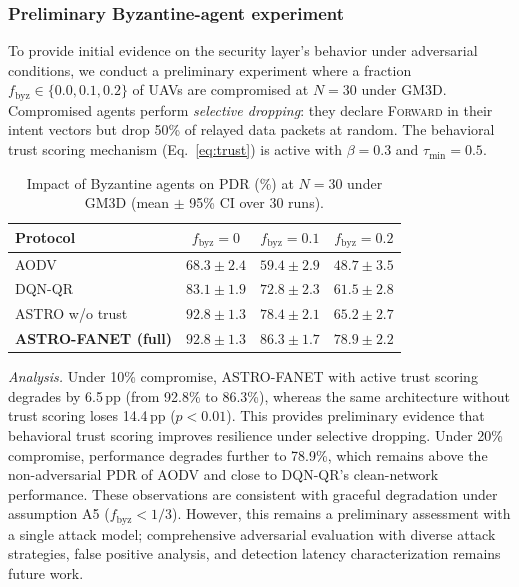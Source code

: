 \documentclass[5p,times]{elsarticle}
\begin{document}
\subsubsection{Preliminary Byzantine-agent experiment}
\label{subsec:byzantine}

To provide initial evidence on the security layer's behavior under adversarial conditions, we conduct a preliminary experiment where a fraction $f_{\mathrm{byz}} \in \{0.0, 0.1, 0.2\}$ of UAVs are compromised at $N=30$ under GM3D. Compromised agents perform \emph{selective dropping}: they declare \textsc{Forward} in their intent vectors but drop 50\% of relayed data packets at random. The behavioral trust scoring mechanism (Eq.~\eqref{eq:trust}) is active with $\beta = 0.3$ and $\tau_{\min} = 0.5$.

\begin{table}[t]
\centering
\caption{Impact of Byzantine agents on PDR (\%) at $N=30$ under GM3D (mean $\pm$ 95\% CI over 30 runs).}
\label{tab:byzantine}
\scriptsize
\begin{tabular}{lccc}
\toprule
Protocol & $f_{\mathrm{byz}}=0$ & $f_{\mathrm{byz}}=0.1$ & $f_{\mathrm{byz}}=0.2$ \\
\midrule
AODV & $68.3 \pm 2.4$ & $59.4 \pm 2.9$ & $48.7 \pm 3.5$ \\
DQN-QR & $83.1 \pm 1.9$ & $72.8 \pm 2.3$ & $61.5 \pm 2.8$ \\
ASTRO w/o trust & $92.8 \pm 1.3$ & $78.4 \pm 2.1$ & $65.2 \pm 2.7$ \\
\textbf{ASTRO-FANET (full)} & $\mathbf{92.8 \pm 1.3}$ & $\mathbf{86.3 \pm 1.7}$ & $\mathbf{78.9 \pm 2.2}$ \\
\bottomrule
\end{tabular}
\end{table}

\textit{Analysis.} Under 10\% compromise, ASTRO-FANET with active trust scoring degrades by 6.5\,pp (from 92.8\% to 86.3\%), whereas the same architecture without trust scoring loses 14.4\,pp ($p < 0.01$). This provides preliminary evidence that behavioral trust scoring improves resilience under selective dropping. Under 20\% compromise, performance degrades further to 78.9\%, which remains above the non-adversarial PDR of AODV and close to DQN-QR's clean-network performance. These observations are consistent with graceful degradation under assumption A5 ($f_{\mathrm{byz}} < 1/3$). However, this remains a preliminary assessment with a single attack model; comprehensive adversarial evaluation with diverse attack strategies, false positive analysis, and detection latency characterization remains future work.
\end{document}
